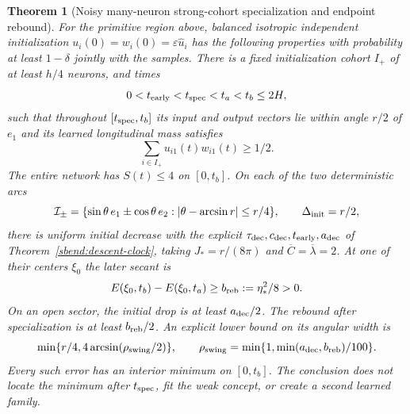 \documentclass[11pt]{article}
\newtheorem{theorem}{Theorem}[section]
\theoremstyle{remark}
\begin{document}
\begin{theorem}[Noisy many-neuron strong-cohort specialization and endpoint rebound]
\label{sbsep:theorem}
For the primitive region above, balanced isotropic independent
initialization $u_i(0)=w_i(0)=\varepsilon\widehat u_i$ has the following
properties with probability at least $1-\delta$ jointly with the samples.
There is a fixed initialization cohort $I_+$ of at least $h/4$ neurons,
and times
\[
 0<t_{\rm early}<t_{\rm spec}<t_a<t_b\le2H,
\]
such that throughout $[t_{\rm spec},t_b]$ its input and output vectors
lie within angle $r/2$ of $e_1$ and its learned longitudinal mass satisfies
\begin{equation}\label{sbsep:learned-mass}
 \sum_{i\in I_+}u_{i1}(t)w_{i1}(t)\ge1/2.
\end{equation}
The entire network has $S(t)\le4$ on $[0,t_b]$.
On each of the two deterministic arcs
\[
 \mathcal I_\pm=\{\sin\theta\,e_1\pm\cos\theta\,e_2:
       |\theta-\arcsin r|\le r/4\},\qquad
 \Delta_{\rm init}=r/2,
\]
there is uniform initial decrease with the explicit
$\tau_{\rm dec},c_{\rm dec},t_{\rm early},a_{\rm dec}$ of
Theorem~\ref{sbend:descent-clock}, taking
$J_*=r/(8\pi)$ and $\overline C=\overline\lambda=2$.
At one of their centers $\xi_0$ the later secant is
\begin{equation}\label{sbsep:noisy-rebound}
 E(\xi_0,t_b)-E(\xi_0,t_a)\ge b_{\rm reb}:=\eta_*^2/8>0.
\end{equation}
On an open sector, the initial drop is at least $a_{\rm dec}/2$.
The rebound after specialization is at least $b_{\rm reb}/2$.
An explicit lower bound on its angular width is
\begin{equation}\label{sbsep:final-sector}
 \min\{r/4,4\arcsin(\rho_{\rm swing}/2)\},\qquad
 \rho_{\rm swing}=\min\{1,\min(a_{\rm dec},b_{\rm reb})/100\}.
\end{equation}
Every such error has an interior minimum on $[0,t_b]$.
The conclusion does not locate the minimum after $t_{\rm spec}$, fit the
weak concept, or create a second learned family.
\end{theorem}
\end{document}
